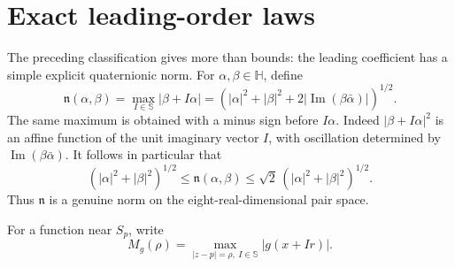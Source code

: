 \documentclass[11pt,a4paper]{article}
\numberwithin{equation}{section}
\theoremstyle{definition}
\theoremstyle{remark}
\newcommand{\HH}{\mathbb H}
\newcommand{\SSS}{\mathbb S}
\newcommand{\Ima}{\operatorname{Im}}
\newcommand{\qnorm}{\mathfrak n}
\begin{document}
\section{Exact leading-order laws}
\label{sec:asymptotics}

The preceding classification gives more than bounds: the leading coefficient
has a simple explicit quaternionic norm. For $\alpha,\beta\in\HH$, define
\begin{equation}
 \qnorm(\alpha,\beta)
  =\max_{I\in\SSS}|\beta+I\alpha|
  =\left(|\alpha|^2+|\beta|^2
                +2|\Ima(\beta\bar\alpha)|\right)^{1/2}.
 \label{eq:pairnorm}
\end{equation}
The same maximum is obtained with a minus sign before $I\alpha$.
Indeed $|\beta+I\alpha|^2$ is an affine function of the unit imaginary
vector $I$, with oscillation determined by $\Ima(\beta\bar\alpha)$.
It follows in particular that
\begin{equation}
 (|\alpha|^2+|\beta|^2)^{1/2}
 \le\qnorm(\alpha,\beta)
 \le\sqrt2\,(|\alpha|^2+|\beta|^2)^{1/2}.
 \label{eq:normequi}
\end{equation}
Thus $\qnorm$ is a genuine norm on the eight-real-dimensional pair space.

For a function near $S_p$, write
\[
 M_g(\rho)=\max_{|z-p|=\rho,\ I\in\SSS}|g(x+Ir)|.
\]
\end{document}
